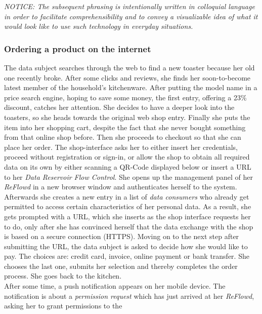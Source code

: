 \documentclass[12pt,english,a4paper,titlepage,cleardoublepage=empty,dottedtoc]{report}
\begin{document}
\emph{NOTICE: The subsequent phrasing is intentionally written in
colloquial language in order to facilitate comprehensibility and to
convey a visualizable idea of what it would look like to use such
technology in everyday situations.}

\subsubsection*{Ordering a product on the
internet}\label{ordering-a-product-on-the-internet}

The data subject searches through the web to find a new toaster because
her old one recently broke. After some clicks and reviews, she finds her
soon-to-become latest member of the household's kitchenware. After
putting the model name in a price search engine, hoping to save some
money, the first entry, offering a 23\% discount, catches her attention.
She decides to have a deeper look into the toasters, so she heads
towards the original web shop entry. Finally she puts the item into her
shopping cart, despite the fact that she never bought something from
that online shop before. Then she proceeds to checkout so that she can
place her order. The shop-interface asks her to either insert her
credentials, proceed without registration or sign-in, or allow the shop
to obtain all required data on its own by either scanning a QR-Code
displayed below or insert a URL to her \emph{Data Reservoir Flow
Control}. She opens up the management panel of her \emph{ReFlowd} in a
new browser window and authenticates herself to the system. Afterwards
she creates a new entry in a list of \emph{data consumers} who already
get permitted to access certain characteristics of her personal data. As
a result, she gets prompted with a URL, which she inserts as the shop
interface requests her to do, only after she has convinced herself that
the data exchange with the shop is based on a secure connection (HTTPS).
Moving on to the next step after submitting the URL, the data subject is
asked to decide how she would like to pay. The choices are: credit card,
invoice, online payment or bank transfer. She chooses the last one,
submits her selection and thereby completes the order process. She goes
back to the kitchen.\\
After some time, a push notification appears on her mobile device. The
notification is about a \emph{permission request} which has just arrived
at her \emph{ReFlowd}, asking her to grant permissions to the
\end{document}
